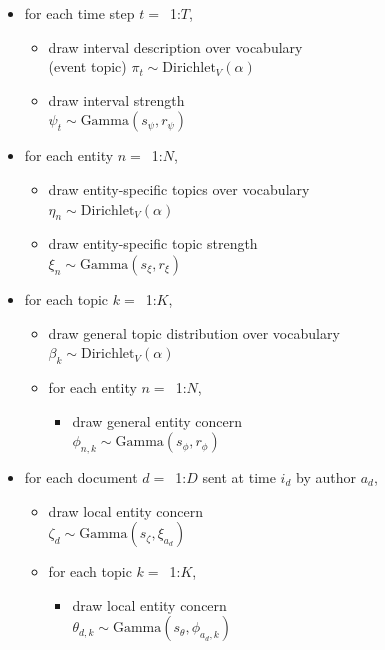 \begin{figure}[htb]
\begin{mdframed}
\small
\begin{itemize}[leftmargin=*]
\item for each time step $t=$~1:$T$,
	\begin{itemize}[leftmargin=*]
	\item draw interval description over vocabulary \\(event topic) $\pi_t \sim \mbox{Dirichlet}_V (\alpha)$
	\item draw interval strength \\$\psi_{t} \sim \mbox{Gamma}(s_\psi, r_\psi)$
	\end{itemize}
\item for each entity $n=$~1:$N$,
	\begin{itemize}[leftmargin=*]
	\item draw entity-specific topics over vocabulary \\$\eta_n \sim \mbox{Dirichlet}_V (\alpha)$
	\item draw entity-specific topic strength \\$\xi_{n} \sim \mbox{Gamma}(s_\xi, r_\xi)$
	\end{itemize}
\item for each topic $k=$~1:$K$,
	\begin{itemize}[leftmargin=*]
	\item draw general topic distribution over vocabulary \\$\beta_k \sim \mbox{Dirichlet}_V (\alpha)$
	\item for each entity $n=$~1:$N$,
		\begin{itemize}[leftmargin=*]
		\item draw general entity concern \\$\phi_{n,k} \sim \mbox{Gamma}(s_\phi, r_\phi)$
		\end{itemize}
	\end{itemize}
\item for each document $d=$~1:$D$ sent at time $i_d$ by author $a_d$,
	\begin{itemize}[leftmargin=*]
	\item draw local entity concern \\$\zeta_{d} \sim \mbox{Gamma}(s_\zeta, \xi_{a_d})$
	\item for each topic $k=$~1:$K$,
		\begin{itemize}[leftmargin=*]
			\item draw local entity concern \\$\theta_{d,k} \sim \mbox{Gamma}(s_\theta, \phi_{a_d,k})$

\end{itemize}
\end{itemize}
\end{itemize}
\end{mdframed}
\end{figure}
